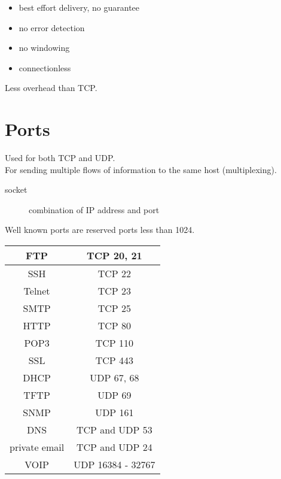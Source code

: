 \documentclass{article}
\begin{document}
\begin{itemize}

\item best effort delivery, no guarantee
\item no error detection
\item no windowing
\item connectionless

\end{itemize}

Less overhead than TCP.

\section{Ports}

Used for both TCP and UDP.\\

For sending multiple flows of information to the same host (multiplexing).

\begin{description}

\item[socket]
combination of IP address and port

\end{description}

Well known ports are reserved ports less than 1024.\\

\begin{tabular}{ | c | c | }
\hline
FTP & TCP 20, 21 \\ \hline
SSH & TCP 22 \\ \hline
Telnet & TCP 23 \\ \hline
SMTP & TCP 25 \\ \hline
HTTP & TCP 80 \\ \hline
POP3 & TCP 110 \\ \hline
SSL & TCP 443 \\ \hline
\hline
DHCP & UDP 67, 68 \\ \hline
TFTP & UDP 69 \\ \hline
SNMP & UDP 161 \\ \hline
\hline
DNS & TCP and UDP 53 \\ \hline
private email & TCP and UDP 24 \\ \hline
\hline
VOIP & UDP 16384 - 32767 \\ \hline
\end{tabular}
\end{document}
